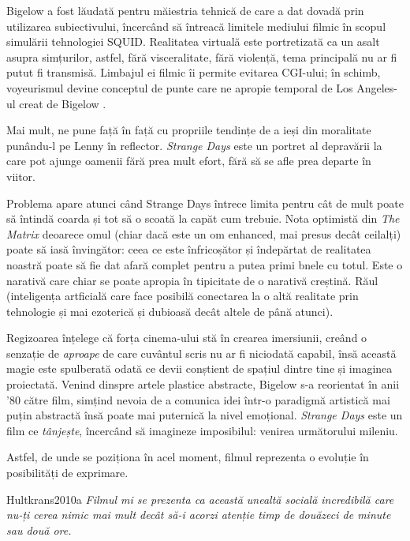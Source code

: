 \documentclass[12pt]{article}
\begin{document}
Bigelow a fost lăudată pentru măiestria tehnică de care a dat dovadă prin utilizarea subiectivului, încercând să întreacă limitele mediului filmic în scopul simulării tehnologiei \dedouble SQUID\sqtworight. Realitatea virtuală este portretizată ca un asalt asupra simțurilor, astfel, fără visceralitate, fără violență, tema principală nu ar fi putut fi transmisă. Limbajul ei filmic îi permite evitarea CGI-ului; în schimb, voyeurismul devine conceptul de punte care ne apropie temporal de Los Angeles-ul creat de Bigelow \cite{Hultkrans2010a}.\par

Mai mult, ne pune față în față cu propriile tendințe de a ieși din moralitate punându-l pe Lenny în reflector. \textit{Strange Days} este un portret al depravării la care pot ajunge oamenii fără prea mult efort, fără să se afle prea departe în viitor.\par

Problema apare atunci când Strange Days întrece limita pentru cât de mult poate să întindă coarda și tot să o scoată la capăt cum trebuie. Nota optimistă din \textit{The Matrix} deoarece omul (chiar dacă este un om enhanced, mai presus decât ceilalți) poate să iasă învingător: ceea ce este înfricoșător și îndepărtat de realitatea noastră poate să fie dat afară complet pentru a putea primi bnele cu totul. Este o narativă care chiar se poate apropia în tipicitate de o narativă creștină. Răul (inteligența artficială care face posibilă conectarea la o altă realitate prin tehnologie și mai ezoterică și dubioasă decât altele de până atunci).\par


Regizoarea înțelege că forța cinema-ului stă în crearea imersiunii, creând o senzație de \textit{aproape} de care cuvântul scris nu ar fi niciodată capabil, însă această magie este spulberată odată ce devii conștient de spațiul dintre tine și imaginea proiectată. Venind dinspre artele plastice abstracte, Bigelow s-a reorientat în anii '80 către film, simțind nevoia de a comunica idei într-o paradigmă artistică mai puțin abstractă însă poate mai puternică la nivel emoțional. \textit{Strange Days} este un film ce \textit{tânjește}, încercând să imagineze imposibilul: venirea următorului mileniu.\par

Astfel, de unde se poziționa în acel moment, filmul reprezenta o evoluție în posibilități de exprimare.\par

\begin{displaycquote}{Hultkrans2010a}
	\textit{Filmul mi se prezenta ca această unealtă socială incredibilă care nu-ți cerea nimic mai mult decât să-i acorzi atenție timp de douăzeci de minute sau două ore.}
\end{displaycquote}
\end{document}

